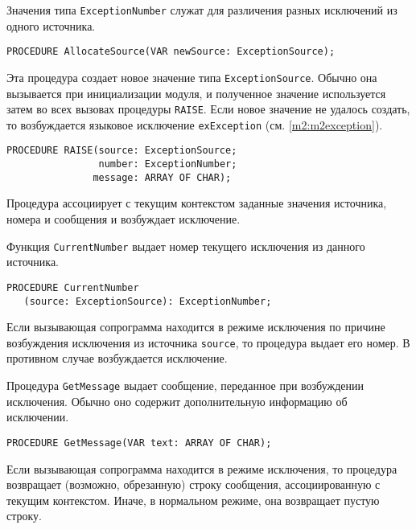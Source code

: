Значения типа {\tt ExceptionNumber} служат для различения разных
исключений из одного источника.

\begin{verbatim}
PROCEDURE AllocateSource(VAR newSource: ExceptionSource);
\end{verbatim}

Эта процедура создает новое значение типа
{\tt ExceptionSource}. Обычно она вызывается при инициализации модуля,
и полученное значение используется затем во всех вызовах процедуры
{\tt RAISE}. Если новое значение не удалось создать, то возбуждается
языковое исключение {\tt exException} (см. \ref{m2:m2exception}).

\begin{verbatim}
PROCEDURE RAISE(source: ExceptionSource;
                number: ExceptionNumber;
               message: ARRAY OF CHAR);
\end{verbatim}

Процедура ассоциирует с текущим контекстом заданные значения 
источника, номера и сообщения и возбуждает исключение.

Функция {\tt CurrentNumber} выдает номер текущего исключения
из данного источника.

\begin{verbatim}
PROCEDURE CurrentNumber
   (source: ExceptionSource): ExceptionNumber;
\end{verbatim}

Если вызывающая сопрограмма находится в режиме исключения по 
причине возбуждения исключения из источника
{\tt source}, то процедура выдает его номер. В противном случае
возбуждается исключение.

Процедура {\tt GetMessage} выдает сообщение, переданное при
возбуждении исключения. Обычно оно содержит дополнительную
информацию об исключении.

\begin{verbatim}
PROCEDURE GetMessage(VAR text: ARRAY OF CHAR);
\end{verbatim}

Если вызывающая сопрограмма находится в режиме исключения, то процедура
возвращает (возможно, обрезанную) строку сообщения, ассоциированную
с текущим контекстом. Иначе, в нормальном режиме, она возвращает
пустую строку.

